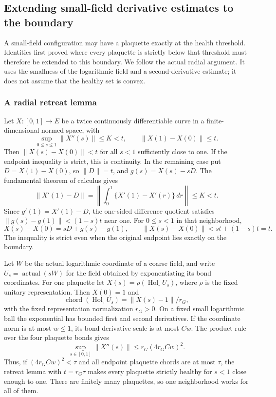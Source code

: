 \subsection{Extending small-field derivative estimates to the boundary}
\label{sec:healthy-boundary-jets}
A small-field configuration may have a plaquette exactly at the
health threshold. Identities first proved where every plaquette is
strictly below that threshold must therefore be extended to this
boundary. We follow the actual radial argument. It uses the smallness
of the logarithmic field and a second-derivative estimate; it does
not assume that the healthy set is convex.

\subsubsection{A radial retreat lemma}
Let $X:[0,1]\to E$ be a twice continuously differentiable curve in
a finite-dimensional normed space, with
\[
 \sup_{0\le s\le1}\|X''(s)\|\le K<t,
             \qquad \|X(1)-X(0)\|\le t.
\]
Then $\|X(s)-X(0)\|<t$ for all $s<1$ sufficiently close to one.
If the endpoint inequality is strict, this is continuity. In the
remaining case put $D=X(1)-X(0)$, so $\|D\|=t$, and
$g(s)=X(s)-sD$. The fundamental theorem of calculus gives
\[
 \|X'(1)-D\|
  =\left\|\int_0^1\{X'(1)-X'(r)\}\,dr\right\|
                      \le K<t.
\]
Since $g'(1)=X'(1)-D$, the one-sided difference quotient satisfies
$\|g(s)-g(1)\|<(1-s)t$ near one. For $0\le s<1$ in that neighborhood,
\[
 X(s)-X(0)=sD+g(s)-g(1),\qquad
 \|X(s)-X(0)\|<st+(1-s)t=t.
\]
The inequality is strict even when the original endpoint lies exactly
on the boundary.

Let $W$ be the actual logarithmic coordinate of a coarse field, and
write $U_s=\operatorname{actual}(sW)$ for the field obtained by
exponentiating its bond coordinates. For one plaquette let
$X(s)=\rho(\operatorname{Hol}_{\square}U_s)$, where $\rho$ is the
fixed unitary representation. Then $X(0)=1$ and
\[
 \operatorname{chord}(\operatorname{Hol}_{\square}U_s)
                     =\|X(s)-1\|/r_G,
\]
with the fixed representation normalization $r_G>0$.
On a fixed small logarithmic ball the exponential has bounded first
and second derivatives. If the coordinate norm is at most $w\le1$,
its bond derivative scale is at most $Cw$. The product rule over the
four plaquette bonds gives
\[
                  \sup_{s\in[0,1]}\|X''(s)\|
                           \le r_G(4r_GCw)^2.
\]
Thus, if $(4r_GCw)^2<\tau$ and all endpoint plaquette chords are at
most $\tau$, the retreat lemma with $t=r_G\tau$ makes every plaquette
strictly healthy for $s<1$ close enough to one. There are finitely
many plaquettes, so one neighborhood works for all of them.

